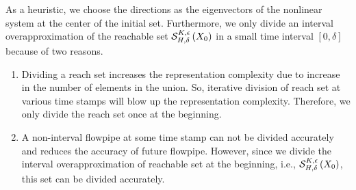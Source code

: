 As a heuristic, we choose the directions as the eigenvectors of the
nonlinear system at the center of the initial set.  Furthermore, we
only divide an interval overapproximation of the reachable set
$\mathcal{S}_{H,\delta}^{K,\epsilon}\left(X_0\right)$ in a small time interval
$[0,\delta]$ because of two reasons.
%
\begin{enumerate}
\item Dividing a reach set increases the representation complexity due to
increase in the number of elements in the union.  So, iterative
division of reach set at various time stamps will blow up the
representation complexity.  Therefore, we only divide the reach set
once at the beginning.
\item  A non-interval flowpipe at some time stamp can not
be divided accurately and reduces the accuracy of future flowpipe.
However, since we divide the interval overapproximation of reachable
set at the beginning, i.e., $\mathcal{S}_{H,\delta}^{K,\epsilon}\left(X_0\right)$,
this set can be divided accurately.
\end{enumerate}
%
%
